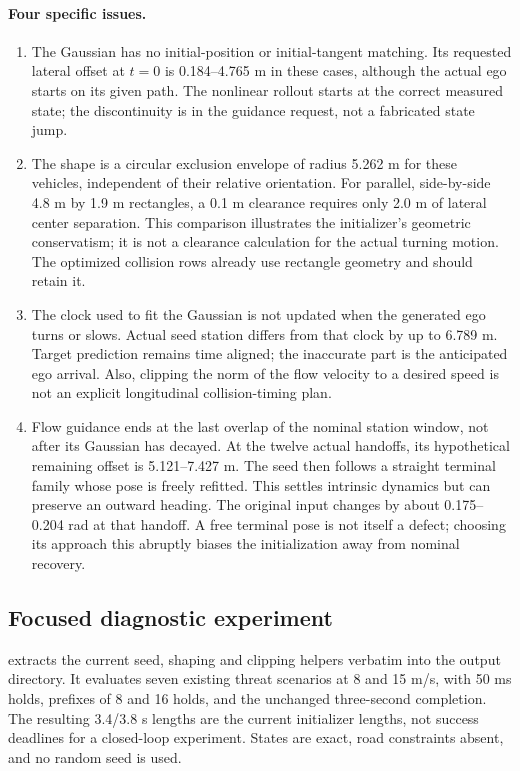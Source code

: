 \documentclass[10pt]{article}
\begin{document}
\paragraph{Four specific issues.}
\begin{enumerate}
\item The Gaussian has no initial-position or initial-tangent matching.
  Its requested lateral offset at $t=0$ is 0.184--4.765 m in these cases,
  although the actual ego starts on its given path. The nonlinear rollout
  starts at the correct measured state; the discontinuity is in the guidance
  request, not a fabricated state jump.
\item The shape is a circular exclusion envelope of radius 5.262 m for these
  vehicles, independent of their relative orientation. For parallel,
  side-by-side 4.8 m by 1.9 m rectangles, a 0.1 m clearance requires only
  2.0 m of lateral center separation. This comparison illustrates the
  initializer's geometric conservatism; it is not a clearance calculation
  for the actual turning motion. The optimized collision rows already use
  rectangle geometry and should retain it.
\item The clock used to fit the Gaussian is not updated when the generated
  ego turns or slows. Actual seed station differs from that clock by up to
  6.789 m. Target prediction remains time aligned; the inaccurate part is
  the anticipated ego arrival. Also, clipping the norm of the flow velocity
  to a desired speed is not an explicit longitudinal collision-timing plan.
\item Flow guidance ends at the last overlap of the nominal station window,
  not after its Gaussian has decayed. At the twelve actual handoffs,
  its hypothetical remaining offset is 5.121--7.427 m. The seed then follows
  a straight terminal family whose pose is freely refitted. This settles
  intrinsic dynamics but can preserve an outward heading. The original
  input changes by about 0.175--0.204 rad at that handoff. A free terminal
  pose is not itself a defect; choosing its approach this abruptly biases
  the initialization away from nominal recovery.
\end{enumerate}

\subsection{Focused diagnostic experiment}
 extracts the current seed,
shaping and clipping helpers verbatim into the output directory. It evaluates
seven existing threat scenarios at 8 and 15 m/s, with 50 ms holds, prefixes
of 8 and 16 holds, and the unchanged three-second completion. The resulting
3.4/3.8 s lengths are the current initializer lengths, not success deadlines
for a closed-loop experiment.
States are exact, road constraints absent, and no random seed is used.
\end{document}
